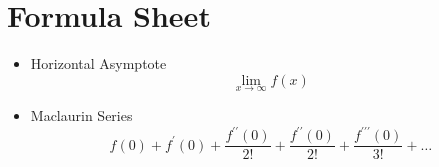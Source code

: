 \documentclass[11pt]{article} %
\begin{document}
\newpage


\LARGE
\section*{Formula Sheet}


\begin{itemize}
	\item Horizontal Asymptote
	\[ \lim_{x \to \infty } f(x) \]
	\item Maclaurin Series
	\[f(0) + f^{\prime}(0) + \frac{f^{\prime \prime}(0)}{2!} + \frac{f^{\prime \prime}(0)}{2!} + \frac{f^{\prime\prime \prime}(0)}{3!} + \ldots \]
\end{itemize}

%
%
%
\newpage




\end{document}
